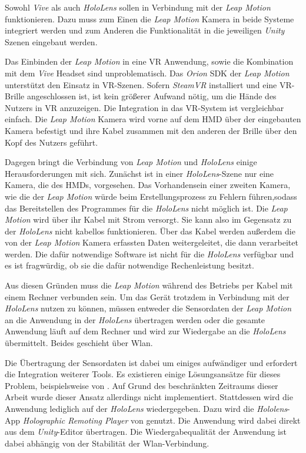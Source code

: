 Sowohl \textit{Vive} als auch \textit{HoloLens} sollen in Verbindung mit der \textit{Leap Motion} funktionieren. Dazu muss zum Einen die \textit{Leap Motion} Kamera in beide Systeme integriert werden und zum Anderen die Funktionalität in die jeweiligen \textit{Unity} Szenen eingebaut werden. 

Das Einbinden der \textit{Leap Motion} in eine VR Anwendung, sowie die Kombination mit dem \textit{Vive} Headset sind unproblematisch. Das \textit{Orion} SDK der \textit{Leap Motion} unterstützt den Einsatz in VR-Szenen. Sofern \textit{SteamVR} installiert und eine VR-Brille angeschlossen ist, ist kein größerer Aufwand nötig, um die Hände des Nutzers in VR anzuzeigen. 
Die Integration in das VR-System ist vergleichbar einfach. Die \textit{Leap Motion} Kamera wird vorne auf dem HMD über der eingebauten Kamera befestigt und ihre Kabel zusammen mit den anderen der Brille über den Kopf des Nutzers geführt. 

Dagegen bringt die Verbindung von \textit{Leap Motion} und \textit{HoloLens} einige Herausforderungen mit sich. Zunächst ist in einer \textit{HoloLens}-Szene nur eine Kamera, die des HMDs, vorgesehen. Das Vorhandensein einer zweiten Kamera, wie die der \textit{Leap Motion} würde beim Erstellungsprozess zu Fehlern führen,sodass das Bereitstellen des Programmes für die \textit{HoloLens} nicht möglich ist.
Die \textit{Leap Motion} wird über ihr Kabel mit Strom versorgt. Sie kann also im Gegensatz zu der \textit{HoloLens} nicht kabellos funktionieren. 
Über das Kabel werden außerdem die von der \textit{Leap Motion} Kamera erfassten Daten weitergeleitet, die dann verarbeitet werden. Die dafür notwendige Software ist nicht für die \textit{HoloLens} verfügbar und es ist fragwürdig, ob sie die dafür notwendige Rechenleistung besitzt. 

Aus diesen Gründen muss die \textit{Leap Motion} während des Betriebs per Kabel mit einem Rechner verbunden sein. Um das Gerät trotzdem in Verbindung mit der \textit{HoloLens} nutzen zu können, müssen entweder die Sensordaten der \textit{Leap Motion} an die Anwendung in der \textit{HoloLens} übertragen werden oder die gesamte Anwendung läuft auf dem Rechner und wird zur Wiedergabe an die \textit{HoloLens} übermittelt. Beides geschieht über Wlan.

Die Übertragung der Sensordaten ist dabei um einiges aufwändiger und erfordert die Integration weiterer Tools. Es existieren einige Lösungsansätze für dieses Problem, beispielsweise von \cite{hololensGithub}. Auf Grund des beschränkten Zeitraums dieser Arbeit wurde dieser Ansatz allerdings nicht implementiert.
Stattdessen wird die Anwendung lediglich auf der \textit{HoloLens} wiedergegeben. Dazu wird die \textit{Hololens}-App \textit{Holographic Remoting Player} von \cite{remoteApp} genutzt. Die Anwendung wird dabei direkt aus dem \textit{Unity}-Editor übertragen.
Die Wiedergabequalität der Anwendung ist dabei abhängig von der Stabilität der Wlan-Verbindung.

